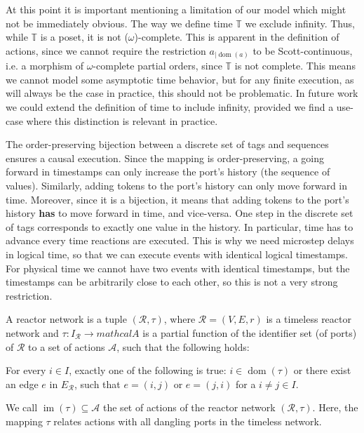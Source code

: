\begin{defn}
\begin{defn}
\begin{defn}
\begin{defn}
At this point it is important mentioning a limitation of our model which might not be immediately obvious.
The way we define time $\mathbb{T}$ we exclude infinity. Thus, while $\mathbb{T}$ is a \ac{poset}, it is not ($\omega$)-complete.
This is apparent in the definition of actions, since we cannot require the restriction $a_{\big| \operatorname{dom}(a)}$ to be Scott-continuous, i.e. a morphism of $\omega$-complete partial orders, since $\mathbb{T}$ is not complete. 
This means we cannot model some asymptotic time behavior, but for any finite execution, as will always be the case in practice, this should not be problematic.
In future work we could extend the definition of time to include infinity, provided we find a use-case where this distinction is relevant in practice.

The order-preserving bijection between a discrete set of tags and sequences ensures a causal execution.
Since the mapping is order-preserving, a going forward in timestamps can only increase the port's history (the sequence of values).
Similarly, adding tokens to the port's history can only move forward in time. 
Moreover, since it is a bijection, it means that adding tokens to the port's history \textbf{has} to move forward in time, and vice-versa.
One step in the discrete set of tags corresponds to exactly one value in the history.
In particular, time has to advance every time reactions are executed. 
This is why we need microstep delays in logical time, so that we can execute events with identical logical timestamps.
For physical time we cannot have two events with identical timestamps, but the timestamps can be arbitrarily close to each other, so this is not a very strong restriction.

\begin{defn}
    \label{defn:reactor_network}
    A reactor network is a tuple $(\mathcal{R},\tau)$, where $\mathcal{R} = (V,E,r)$ is a timeless reactor network and $\tau : I_\mathcal{R} \rightarrow mathcal{A}$ is a partial function of the identifier set (of ports) of $\mathcal{R}$ to a set of actions $\mathcal{A}$, such that the following holds:
    \begin{itemize}
        For every $i \in I$, exactly one of the following is true: $i \in \operatorname{dom}(\tau)$ or there exist an edge $e$ in $E_{\mathcal{R}}$, such that $e = (i,j)$ or $e = (j,i)$ for a $i \neq j \in I$.
    \end{itemize}
\end{defn}

We call $\operatorname{im}(\tau) \subseteq \mathcal{A}$ the set of actions of the reactor network $(\mathcal{R},\tau)$.
Here, the mapping $\tau$ relates actions with all dangling ports in the timeless network.


\end{defn}
\end{defn}
\end{defn}
\end{defn}
